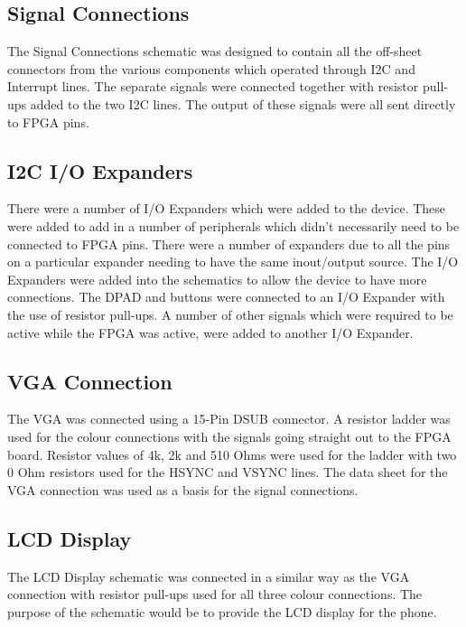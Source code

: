 \subsection{Signal Connections}

	The Signal Connections schematic was designed to contain all the off-sheet connectors from the various components which operated through I2C and Interrupt lines. The separate signals were connected together with resistor pull-ups added to the two I2C lines. The output of these signals were all sent directly to FPGA pins. 

\subsection{I2C I/O Expanders}

	There were a number of I/O Expanders which were added to the device. These were added to add in a number of peripherals which didn't necessarily need to be connected to FPGA pins. There were a number of expanders due to all the pins on a particular expander needing to have the same inout/output source. 
The I/O Expanders were added into the schematics to allow the device to have more connections. The DPAD and buttons were connected to an I/O Expander with the use of resistor pull-ups. A number of other signals which were required to be active while the FPGA was active, were added to another I/O Expander.

\subsection{VGA Connection}
\label{chap:VGA}

	The VGA was connected using a 15-Pin DSUB connector. A resistor ladder was used for the colour connections with the signals going straight out to the FPGA board. Resistor values of 4k, 2k and 510 Ohms were used for the ladder with two 0 Ohm resistors used for the HSYNC and VSYNC lines. The data sheet for the VGA connection was used as a basis for the signal connections. 
 
\subsection{LCD Display}
\label{chap:LCD}

	The LCD Display schematic was connected in a similar way as the VGA connection with resistor pull-ups used for all three colour connections. The purpose of the schematic would be to provide the LCD display for the phone.

